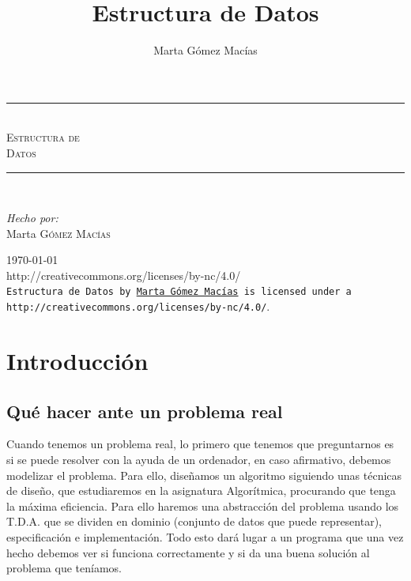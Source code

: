 \documentclass[10pt,a4paper,spanish]{report}
\title{Estructura de Datos}
\author{Marta Gómez Macías}
\newcommand{\HRule}{\rule{\linewidth}{0.5mm}} %
\begin{document}
      \begin{titlepage}
            \begin{center}
                  \HRule \\[0.4cm]
                  \textsc{\Huge \textcolor[rgb]{0.2,0.8,0.4}Estructura \textcolor[rgb]{0.5,0.1,0.5}de\\[0.5cm] \textcolor[rgb]{0.7,0.8,0.9}Datos}\\[1.5cm]
                  \HRule \\[1cm]
                  \begin{flushleft}
                        \emph{Hecho por:}\\
                        Marta \textsc{Gómez Macías}
                  \end{flushleft}
                  \vspace{10cm}
                  {\Large \today}
                  \vspace{5mm}
                  \\
            {http://creativecommons.org/licenses/by-nc/4.0/}\\
            \texttt{Estructura de Datos by
            \href{mailto:mgmacias95@gmail.com}{Marta Gómez Macías}
            is licensed under a 
            {http://creativecommons.org/licenses/by-nc/4.0/}}.
            \end{center}
      \end{titlepage}

      \setcounter{chapter}{-1}

      \tableofcontents

\chapter{\textcolor[rgb]{0.5,0.8,0.1}{Introducción}}
      \section{\textcolor[rgb]{0.5,0.8,0.1}Qué hacer ante un problema real}
      \noindent
            Cuando tenemos un problema real, lo primero que tenemos que preguntarnos es si se puede resolver con la ayuda de un ordenador, en caso afirmativo, debemos modelizar el problema. Para ello, diseñamos un algoritmo siguiendo unas técnicas de diseño, que estudiaremos en la asignatura Algorítmica, procurando que tenga la máxima eficiencia. Para ello haremos una abstracción del problema usando los T.D.A. que se dividen en dominio (conjunto de datos que puede representar), especificación e implementación. Todo esto dará lugar a un programa que una vez hecho debemos ver si funciona correctamente y si da una buena solución al problema que teníamos.
\end{document}
